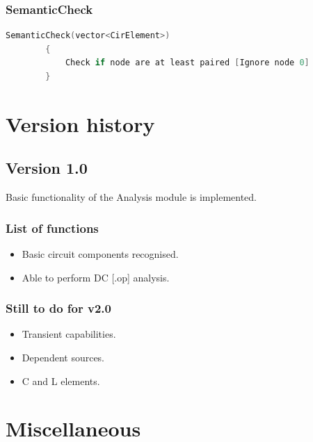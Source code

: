 \documentclass[a4paper, titlepage]{article}
\begin{document}
    \subsubsection{SemanticCheck}
    \begin{lstlisting}[language=C++]
        SemanticCheck(vector<CirElement>)
        {
            Check if node are at least paired [Ignore node 0]
        }
    \end{lstlisting}
    
    \pagebreak

    \section{Version history}
    \subsection{Version 1.0}
    Basic functionality of the Analysis module is implemented.
    \subsubsection{List of functions}
    \begin{itemize}
        \item Basic circuit components recognised.
        \item Able to perform DC [.op] analysis.
    \end{itemize}
    \subsubsection{Still to do for v2.0}
    \begin{itemize}
        \item Transient capabilities.
        \item Dependent sources.
        \item C and L elements.
    \end{itemize}
    \pagebreak
    \section{Miscellaneous}



    \pagebreak
    \printbibliography[title={References}]
\end{document}
